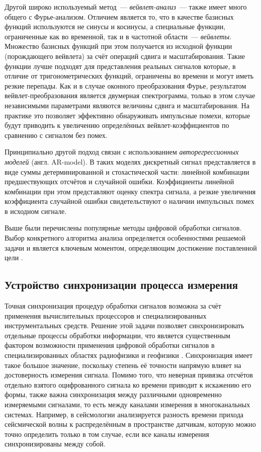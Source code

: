 \documentclass[a4paper, 14pt, titlepage]{extarticle}
\newcommand{\eng}[1]{\foreignlanguage{english}{#1}}
\newcommand{\term}[1]{\emph{#1}}
\begin{document}
  Другой широко используемый метод~--- \term{вейвлет-анализ}~--- также имеет много общего с
  Фурье-анализом. Отличием является то, что в качестве базисных функций используются не синусы и
  косинусы, а специальные функции, ограниченные как во временной, так и в частотной области~---
  \term{вейвлеты}. Множество базисных функций при этом получается из исходной функции (порождающего
  вейвлета) за счёт операций сдвига и масштабирования. Такие функции лучше подходят для представления
  реальных сигналов которые, в отличие от тригонометрических функций, ограничены во времени и могут иметь
  резкие перепады. Как и в случае оконного преобразования Фурье, результатом вейвлет-преобразования является
  двумерная спектрограмма, только в этом случае независимыми параметрами являются величины сдвига и
  масштабирования. На практике это позволяет эффективно обнаруживать импульсные помехи, которые
  будут приводить к увеличению определённых вейвлет-коэффициентов по сравнению с сигналом без помех.

  Принципиально другой подход связан с использованием \term{авторегрессионных моделей} (англ.
  \eng{AR-model}). В таких моделях дискретный сигнал представляется в виде суммы детерминированной и
  стохастической части: линейной комбинации предшествующих отсчётов и случайной ошибки.
  Коэффициенты линейной комбинации при этом представляют оценку спектра сигнала, а резкие увеличения
  коэффициента случайной ошибки свидетельствуют о наличии импульсных помех в исходном сигнале.

  Выше были перечислены популярные методы цифровой обработки сигналов. Выбор конкретного алгоритма
  анализа определяется особенностями решаемой задачи и является ключевым моментом, определяющим
  достижение поставленной цели \cite{zubarev-realtime}.

  \subsection{Устройство синхронизации процесса измерения}\label{ssec:sync}

  Точная синхронизация процедур обработки
  сигналов возможна за счёт применения вычислительных процессоров и специализированных
  инструментальных средств. Решение этой задачи позволяет синхронизировать отдельные процессы
  обработки информации, что является существенным фактором возможности применения
  цифровой обработки сигналов в специализированных областях радиофизики и геофизики \cite{rathore-digital}.
  Синхронизация имеет такое большое значение, поскольку степень её точности напрямую влияет на
  достоверность измерения сигнала. Помимо того, что неверная привязка отсчётов отдельно взятого
  оцифрованного сигнала ко времени приводит к искажению его формы, также важна синхронизация между
  различными одновременно измеряемыми сигналами, то есть между каналами измерения в многоканальных
  системах. Например, в сейсмологии анализируется разность времени прихода сейсмической волны к
  распределённым в пространстве датчикам, которую можно точно определить только в том случае, если
  все каналы измерения синхронизированы между собой. %
\end{document}

